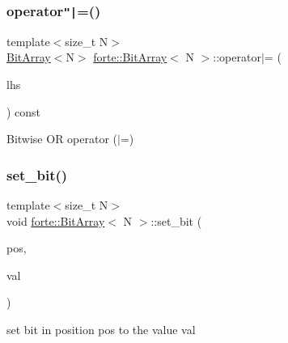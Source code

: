 \subsubsection{\texorpdfstring{operator\texttt{"|}=()}{operator|=()}}
{\footnotesize\ttfamily template$<$size\+\_\+t N$>$ \\
\mbox{\hyperlink{classforte_1_1_bit_array}{Bit\+Array}}$<$N$>$ \mbox{\hyperlink{classforte_1_1_bit_array}{forte\+::\+Bit\+Array}}$<$ N $>$\+::operator$\vert$= (\begin{DoxyParamCaption}\item[{const \mbox{\hyperlink{classforte_1_1_bit_array}{Bit\+Array}}$<$ N $>$ \&}]{lhs }\end{DoxyParamCaption}) const\hspace{0.3cm}{\ttfamily [inline]}}



Bitwise OR operator ($\vert$=) 

\mbox{\label{classforte_1_1_bit_array_aded6c5518708c6433bba8c7b9115199d}} 
\subsubsection{\texorpdfstring{set\+\_\+bit()}{set\_bit()}}
{\footnotesize\ttfamily template$<$size\+\_\+t N$>$ \\
void \mbox{\hyperlink{classforte_1_1_bit_array}{forte\+::\+Bit\+Array}}$<$ N $>$\+::set\+\_\+bit (\begin{DoxyParamCaption}\item[{size\+\_\+t}]{pos,  }\item[{bool}]{val }\end{DoxyParamCaption})\hspace{0.3cm}{\ttfamily [inline]}}



set bit in position pos to the value val 

\mbox{\label{classforte_1_1_bit_array_a52623739054020b7da6ffab1cacf033e}} 
